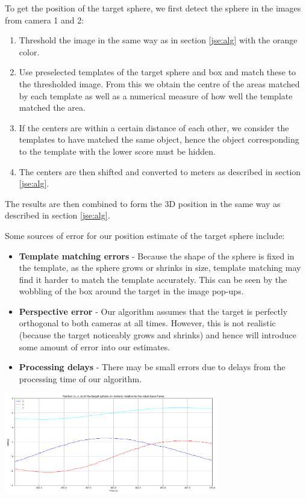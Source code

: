 \documentclass[11pt]{article}
\begin{document}
To get the position of the target sphere, we first detect the sphere in the images from camera 1 and 2:
\begin{enumerate}
	\item Threshold the image in the same way as in section \ref{jse:alg} with the orange color.
	\item Use preselected templates of the target sphere and box and match these to the thresholded image. From this we obtain the centre of the areas matched by each template as well as a numerical measure of how well the template matched the area.
	\item If the centers are within a certain distance of each other, we consider the templates to have matched the same object, hence the object corresponding to the template with the lower score must be hidden.
	\item The centers are then shifted and converted to meters as described in section \ref{jse:alg}.
\end{enumerate}

\noindent The results are then combined to form the 3D position in the same way as described in section \ref{jse:alg}.

\noindent Some sources of error for our position estimate of the target sphere include:
\begin{itemize}
	\item \textbf{Template matching errors} - Because the shape of the sphere is fixed in the template, as the sphere grows or shrinks in size, template matching may find it harder to match the template accurately. This can be seen by the wobbling of the box around the target in the image pop-ups.
	\item \textbf{Perspective error} - Our algorithm assumes that the target is perfectly orthogonal to both cameras at all times. However, this is not realistic (because the target noticeably grows and shrinks) and hence will introduce some amount of error into our estimates.
	\item \textbf{Processing delays} - There may be small errors due to delays from the processing time of our algorithm.
\end{itemize}

\begin{center}
	\includegraphics[width=0.7\textwidth]{target-sphere}
\end{center}
\end{document}
